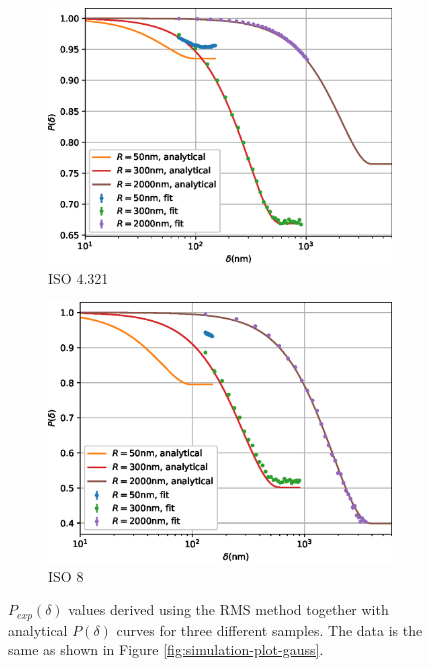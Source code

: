 \begin{figure}[p]
\begin{subfigure}[b]{0.45\textwidth}
		\includegraphics[width=\textwidth]{simulation-plot-rms-ISO-4.321}
		\caption{ISO 4.321}
		\label{fig:simulation-plot-rms-ISO-4.321}
	\end{subfigure}
	\hfill
	\begin{subfigure}[b]{0.45\textwidth}
		\centering
		\includegraphics[width=\textwidth]{simulation-plot-rms-ISO-8}
		\caption{ISO 8}
		\label{fig:simulation-plot-rms-ISO-8}
	\end{subfigure}
	\caption{$P_{exp}(\delta)$ values derived using the RMS method together with analytical $P(\delta)$ curves for three different samples. The data is the same as shown in Figure \ref{fig:simulation-plot-gauss}.}
	\label{fig:simulation-plot-rms}
\end{figure}


